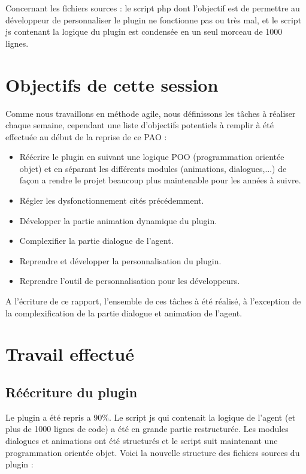 \documentclass[11pt,dvipsnames,svgnames]{report}
\begin{document}
	 Concernant les fichiers sources : le script php dont l'objectif est de permettre au développeur de personnaliser le plugin ne fonctionne pas ou très mal, et le script js contenant la logique du plugin est condensée en un seul morceau de 1000 lignes.
	 
\chapter{Objectifs de cette session}

	Comme nous travaillons en méthode agile, nous définissons les tâches à réaliser chaque semaine, cependant une liste d'objectifs potentiels à remplir à été effectuée au début de la reprise de ce PAO :\\
	
	\begin{itemize}
	\item Réécrire le plugin en suivant une logique POO (programmation orientée objet) et en séparant les différents modules (animations, dialogues,...) de façon a rendre le projet beaucoup plus maintenable pour les années à suivre.
	\item Régler les dysfonctionnement cités précédemment.
	\item Développer la partie animation dynamique du plugin.
	\item Complexifier la partie dialogue de l'agent.
	\item Reprendre et développer la personnalisation du plugin.
	\item Reprendre l'outil de personnalisation pour les développeurs.\\
	\end{itemize}
	
	A l'écriture de ce rapport, l'ensemble de ces tâches à été réalisé, à l'exception de la complexification de la partie dialogue et animation de l'agent.
	
\chapter{Travail effectué}

	\section{Réécriture du plugin}
	
	Le plugin a été repris a 90\%. Le script js qui contenait la logique de l'agent (et plus de 1000 lignes de code) a été en grande partie restructurée. Les modules dialogues et animations ont été structurés et le script suit maintenant une programmation orientée objet. Voici la nouvelle structure des fichiers sources du plugin :\\
	
\end{document}
